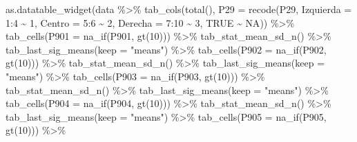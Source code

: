 \documentclass[
]{book}
\newenvironment{Shaded}{\begin{snugshade}}{\end{snugshade}}
\newcommand{\AttributeTok}[1]{\textcolor[rgb]{0.77,0.63,0.00}{#1}}
\newcommand{\ConstantTok}[1]{\textcolor[rgb]{0.00,0.00,0.00}{#1}}
\newcommand{\DecValTok}[1]{\textcolor[rgb]{0.00,0.00,0.81}{#1}}
\newcommand{\FunctionTok}[1]{\textcolor[rgb]{0.00,0.00,0.00}{#1}}
\newcommand{\NormalTok}[1]{#1}
\newcommand{\SpecialCharTok}[1]{\textcolor[rgb]{0.00,0.00,0.00}{#1}}
\newcommand{\StringTok}[1]{\textcolor[rgb]{0.31,0.60,0.02}{#1}}
\begin{document}
\begin{Shaded}
\begin{Highlighting}[]
\FunctionTok{as.datatable\_widget}\NormalTok{(data }\SpecialCharTok{\%\textgreater{}\%}
  \FunctionTok{tab\_cols}\NormalTok{(}\FunctionTok{total}\NormalTok{(), }\AttributeTok{P29 =} \FunctionTok{recode}\NormalTok{(P29, }\AttributeTok{Izquierda =} \DecValTok{1}\SpecialCharTok{:}\DecValTok{4} \SpecialCharTok{\textasciitilde{}}
    \DecValTok{1}\NormalTok{, }\AttributeTok{Centro =} \DecValTok{5}\SpecialCharTok{:}\DecValTok{6} \SpecialCharTok{\textasciitilde{}} \DecValTok{2}\NormalTok{, }\AttributeTok{Derecha =} \DecValTok{7}\SpecialCharTok{:}\DecValTok{10} \SpecialCharTok{\textasciitilde{}} \DecValTok{3}\NormalTok{, }\ConstantTok{TRUE} \SpecialCharTok{\textasciitilde{}} \ConstantTok{NA}\NormalTok{)) }\SpecialCharTok{\%\textgreater{}\%}
  \FunctionTok{tab\_cells}\NormalTok{(}\AttributeTok{P901 =} \FunctionTok{na\_if}\NormalTok{(P901, }\FunctionTok{gt}\NormalTok{(}\DecValTok{10}\NormalTok{))) }\SpecialCharTok{\%\textgreater{}\%}
  \FunctionTok{tab\_stat\_mean\_sd\_n}\NormalTok{() }\SpecialCharTok{\%\textgreater{}\%}
  \FunctionTok{tab\_last\_sig\_means}\NormalTok{(}\AttributeTok{keep =} \StringTok{"means"}\NormalTok{) }\SpecialCharTok{\%\textgreater{}\%}
  \FunctionTok{tab\_cells}\NormalTok{(}\AttributeTok{P902 =} \FunctionTok{na\_if}\NormalTok{(P902, }\FunctionTok{gt}\NormalTok{(}\DecValTok{10}\NormalTok{))) }\SpecialCharTok{\%\textgreater{}\%}
  \FunctionTok{tab\_stat\_mean\_sd\_n}\NormalTok{() }\SpecialCharTok{\%\textgreater{}\%}
  \FunctionTok{tab\_last\_sig\_means}\NormalTok{(}\AttributeTok{keep =} \StringTok{"means"}\NormalTok{) }\SpecialCharTok{\%\textgreater{}\%}
  \FunctionTok{tab\_cells}\NormalTok{(}\AttributeTok{P903 =} \FunctionTok{na\_if}\NormalTok{(P903, }\FunctionTok{gt}\NormalTok{(}\DecValTok{10}\NormalTok{))) }\SpecialCharTok{\%\textgreater{}\%}
  \FunctionTok{tab\_stat\_mean\_sd\_n}\NormalTok{() }\SpecialCharTok{\%\textgreater{}\%}
  \FunctionTok{tab\_last\_sig\_means}\NormalTok{(}\AttributeTok{keep =} \StringTok{"means"}\NormalTok{) }\SpecialCharTok{\%\textgreater{}\%}
  \FunctionTok{tab\_cells}\NormalTok{(}\AttributeTok{P904 =} \FunctionTok{na\_if}\NormalTok{(P904, }\FunctionTok{gt}\NormalTok{(}\DecValTok{10}\NormalTok{))) }\SpecialCharTok{\%\textgreater{}\%}
  \FunctionTok{tab\_stat\_mean\_sd\_n}\NormalTok{() }\SpecialCharTok{\%\textgreater{}\%}
  \FunctionTok{tab\_last\_sig\_means}\NormalTok{(}\AttributeTok{keep =} \StringTok{"means"}\NormalTok{) }\SpecialCharTok{\%\textgreater{}\%}
  \FunctionTok{tab\_cells}\NormalTok{(}\AttributeTok{P905 =} \FunctionTok{na\_if}\NormalTok{(P905, }\FunctionTok{gt}\NormalTok{(}\DecValTok{10}\NormalTok{))) }\SpecialCharTok{\%\textgreater{}\%}

\end{Highlighting}
\end{Shaded}
\end{document}
